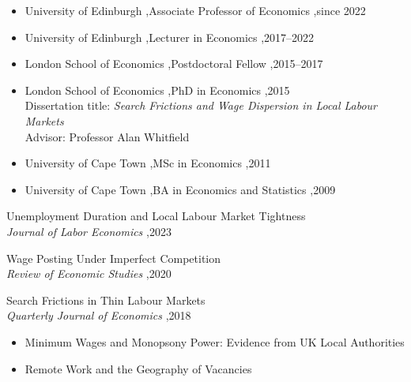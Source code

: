 \documentclass[letterpaper,10pt]{article}
\begin{document}


\begin{itemize}
\item University of Edinburgh \sep Associate Professor of Economics \sep since 2022
\item University of Edinburgh \sep Lecturer in Economics \sep 2017--2022
\item London School of Economics \sep Postdoctoral Fellow \sep 2015--2017
\end{itemize}


\begin{itemize}
\item London School of Economics \sep PhD in Economics \sep 2015\\
Dissertation title: \textit{Search Frictions and Wage Dispersion in Local
Labour Markets}\\
Advisor: Professor Alan Whitfield
\item University of Cape Town \sep MSc in Economics \sep 2011
\item University of Cape Town \sep BA in Economics and Statistics \sep 2009
\end{itemize}


\begin{etaremune}
\item Unemployment Duration and Local Labour Market Tightness \\
\textit{Journal of Labor Economics} \sep 2023
\item Wage Posting Under Imperfect Competition\\
\textit{Review of Economic Studies} \sep 2020
\item Search Frictions in Thin Labour Markets \\
\textit{Quarterly Journal of Economics} \sep 2018
\end{etaremune}


\begin{itemize}
\item Minimum Wages and Monopsony Power: Evidence from UK Local Authorities 
\item Remote Work and the Geography of Vacancies
\end{itemize}
\end{document}

